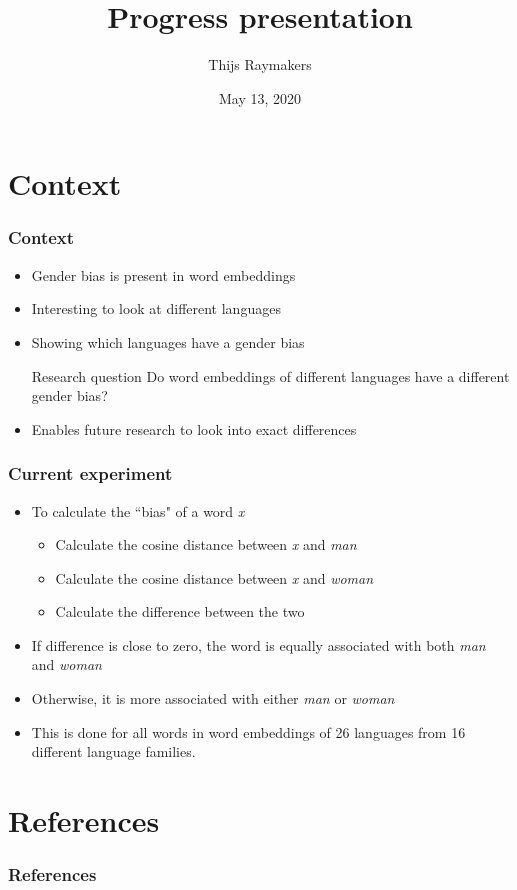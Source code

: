 \documentclass[handout]{beamer}
\author{Thijs Raymakers}
\title{Progress presentation}
\date{May 13, 2020}
\begin{document}
\begin{frame}
    \titlepage
\end{frame}

\section{Context}
\begin{frame}
\frametitle{Context}
\begin{itemize}
    \item Gender bias is present in word embeddings~
    \pause
    \item Interesting to look at different languages
    \pause
    \item Showing which languages have a gender bias
    \pause
    \begin{block}{Research question}
        Do word embeddings of different languages have a different gender bias?
    \end{block}
    \pause
    \item Enables future research to look into exact differences
\end{itemize}
\end{frame}

\begin{frame}
    \frametitle{Current experiment}
    \begin{itemize}
        \item To calculate the ``bias" of a word \textit{x}
        \begin{itemize}
            \item Calculate the cosine distance between \textit{x} and \textit{man}
            \item Calculate the cosine distance between \textit{x} and \textit{woman}
            \item Calculate the difference between the two 
        \end{itemize}
        \pause
        \item If difference is close to zero, the word is equally associated with both \textit{man} and \textit{woman}
        \item Otherwise, it is more associated with either \textit{man} or \textit{woman}
        \pause
        \item This is done for all words in word embeddings of 26 languages from 16 different language families.
    \end{itemize}
\end{frame}

\section{References}
\begin{frame}
\frametitle{References}
\printbibliography[heading=none]
\end{frame}
\end{document}
